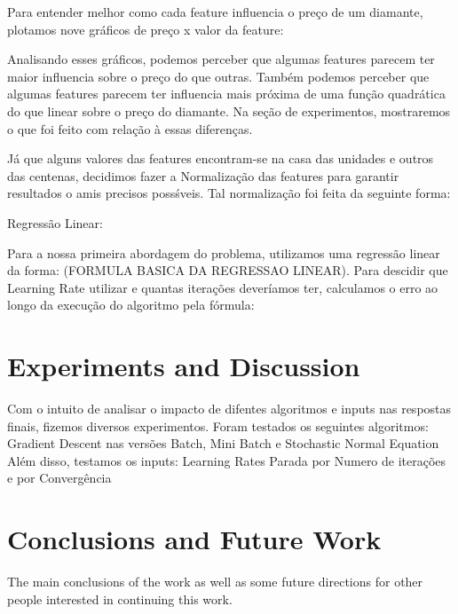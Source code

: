 \documentclass[conference]{IEEEtran}
\begin{document}
Para entender melhor como cada feature influencia o preço de um diamante, plotamos nove gráficos de preço x valor da feature:


Analisando esses gráficos, podemos perceber que algumas features parecem ter maior influencia sobre o preço do que outras. Também podemos perceber que algumas features parecem ter influencia mais próxima de uma função quadrática do que linear sobre o preço do diamante. Na seção de experimentos, mostraremos o que foi feito com relação à essas diferenças.

Já que alguns valores das features encontram-se na casa das unidades e outros das centenas, decidimos fazer a Normalização das features para garantir resultados o amis precisos possśveis. Tal normalização foi feita da seguinte forma:




Regressão Linear:

Para a nossa primeira abordagem do problema, utilizamos uma regressão linear da forma: (FORMULA BASICA DA REGRESSAO LINEAR).
Para descidir que Learning Rate utilizar e quantas iterações deveríamos ter, calculamos o erro ao longo da execução do algoritmo pela fórmula:




\section{Experiments and Discussion}

Com o intuito de analisar o impacto de difentes algoritmos e inputs nas respostas finais, fizemos diversos experimentos.
Foram testados os seguintes algoritmos:
Gradient Descent nas versões Batch, Mini Batch e Stochastic
Normal Equation
Além disso, testamos os inputs:
Learning Rates
Parada por Numero de iterações e por Convergência




\section{Conclusions and Future Work}

The main conclusions of the work as well as some future directions for other people interested in continuing this work. ~\cite{b1}



\end{document}
